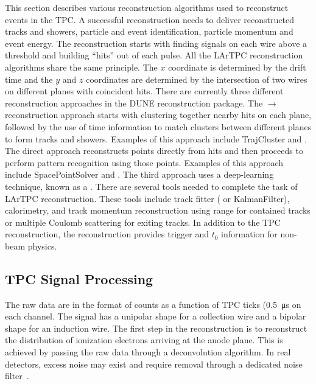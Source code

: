 This section describes various reconstruction algorithms used to reconstruct events in the  TPC. A successful \lartpc reconstruction needs to deliver reconstructed tracks and showers, particle and event identification, particle momentum and event energy. The reconstruction starts with finding signals on each wire above a threshold and building ``hits'' out of each pulse. All the LArTPC \threed reconstruction algorithms share the same principle. The $x$ coordinate is determined by the drift time and the $y$ and $z$ coordinates are determined by the intersection of two wires on different planes with coincident hits. There are currently three different reconstruction approaches in the DUNE reconstruction package. The \twod$\rightarrow$\threed reconstruction approach starts with clustering together nearby hits on each plane, %
followed by the use of time information to match \twod clusters between different planes to form \threed tracks and showers. Examples of this approach include TrajCluster and .  The direct \threed approach reconstructs \threed points directly from hits and then proceeds to perform pattern recognition using those \threed points. Examples of this approach include SpacePointSolver and . The third approach uses a deep-learning technique, known as a . There are several tools needed to complete the task of LArTPC reconstruction. These tools include track fitter ( or KalmanFilter), calorimetry,  and track momentum reconstruction using range for contained tracks or multiple Coulomb scattering for exiting tracks. In addition to the TPC reconstruction, the  reconstruction provides trigger and $t_0$ information for non-beam physics. 



\subsection{TPC Signal Processing}\label{sec:tpc_sp}

The raw data are in the format of  counts as a function of TPC ticks (\SI{0.5}{\micro\second} on each channel. The signal has a 
unipolar shape for a collection wire and a bipolar shape for an induction wire. The first step 
in the reconstruction is to reconstruct the distribution of ionization electrons arriving at the anode plane. 
This is achieved by passing the raw data through a deconvolution algorithm. In real detectors, excess 
noise may exist and require removal %
through a dedicated noise filter~\cite{Acciarri:2017sde}. 

